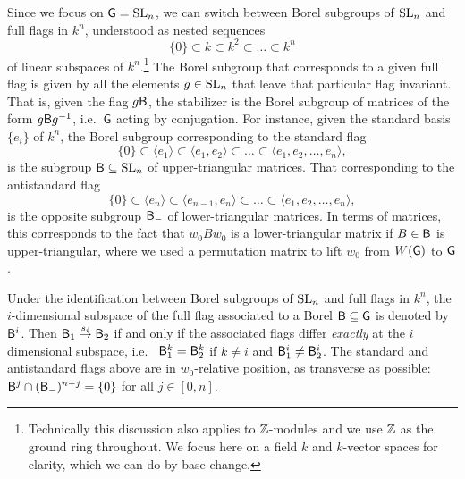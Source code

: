 \begin{remark}\label{rmk:borels_flags} Since we focus on $\mathsf{G}=\operatorname{SL}_n$, we can switch between Borel subgroups of $\operatorname{SL}_n$ and full flags in $k^n$, understood as nested sequences
$$\{0\}\subset k\subset k^2\subset\ldots \subset k^n$$
of linear subspaces of $k^n$.\footnote{Technically this discussion also applies to $\mathbb{Z}$-modules and we use $\mathbb{Z}$ as the ground ring throughout. We focus here on a field $k$ and $k$-vector spaces for clarity, which we can do by base change.} The Borel subgroup that corresponds to a given full flag is given by all the elements $g\in\operatorname{SL}_n$ that leave that particular flag invariant. That is, given the flag $g\mathsf{B}$, the stabilizer is the Borel subgroup of matrices of the form $g\mathsf{B} g^{-1}$, i.e.~$\mathsf{G}$ acting by conjugation. For instance, given the standard basis $\{e_i\}$ of $k^n$, the Borel subgroup corresponding to the standard flag
$$\{0\}\subset \langle e_1\rangle\subset \langle e_1,e_2\rangle\subset\ldots \subset \langle e_1,e_2,\ldots,e_n\rangle,$$
is the subgroup $\mathsf{B}\subseteq\operatorname{SL}_n$ of upper-triangular matrices. That corresponding to the antistandard flag
$$\{0\}\subset \langle e_n\rangle\subset \langle e_{n-1},e_n\rangle\subset\ldots \subset \langle e_1,e_2,\ldots,e_n\rangle,$$
is the opposite subgroup $\mathsf{B}_-$ of lower-triangular matrices. In terms of matrices, this corresponds to the fact that $w_0Bw_0$ is a lower-triangular matrix if $B\in\mathsf{B}$ is upper-triangular, where we used a permutation matrix to lift $w_0$ from $W(\mathsf{G})$ to $\mathsf{G}$.

Under the identification between Borel subgroups of $\operatorname{SL}_n$ and full flags in $k^n$, the $i$-dimensional subspace of the full flag associated to a Borel $\mathsf{B}\subseteq\mathsf{G}$ is denoted by $\mathsf{B}^i$. Then $\mathsf{B}_1\stackrel{s_i}{\to}\mathsf{B}_2$ if and only if the associated flags differ {\it exactly} at the $i$ dimensional subspace, i.e.~ $\mathsf{B}_1^k=\mathsf{B}_2^k$ if $k\neq i$ and $\mathsf{B}_1^i\neq\mathsf{B}_2^i$. The standard and antistandard flags above are in $w_0$-relative position, as transverse as possible: $\mathsf{B}^j\cap(\mathsf{B}_-)^{n-j}=\{0\}$ for all $j\in[0,n]$.\sbs
\end{remark}

